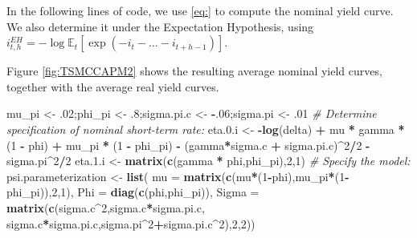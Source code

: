 \documentclass[
  12pt,
]{book}
\newenvironment{Shaded}{\begin{snugshade}}{\end{snugshade}}
\newcommand{\AttributeTok}[1]{\textcolor[rgb]{0.13,0.29,0.53}{#1}}
\newcommand{\CommentTok}[1]{\textcolor[rgb]{0.56,0.35,0.01}{\textit{#1}}}
\newcommand{\DecValTok}[1]{\textcolor[rgb]{0.00,0.00,0.81}{#1}}
\newcommand{\FloatTok}[1]{\textcolor[rgb]{0.00,0.00,0.81}{#1}}
\newcommand{\FunctionTok}[1]{\textcolor[rgb]{0.13,0.29,0.53}{\textbf{#1}}}
\newcommand{\NormalTok}[1]{#1}
\newcommand{\OtherTok}[1]{\textcolor[rgb]{0.56,0.35,0.01}{#1}}
\newcommand{\SpecialCharTok}[1]{\textcolor[rgb]{0.81,0.36,0.00}{\textbf{#1}}}
\theoremstyle{definition}
\theoremstyle{definition}
\theoremstyle{definition}
\theoremstyle{definition}
\theoremstyle{remark}
\begin{document}
In the following lines of code, we use \ref{eq:} to compute the nominal yield curve. We also determine it under the Expectation Hypothesis, using \(i^{EH}_{t,h} = - \log \mathbb{E}_t [\exp(-i_t - \dots - i_{t+h-1})]\).

Figure \ref{fig:TSMCCAPM2} shows the resulting average nominal yield curves, together with the average real yield curves.

\begin{Shaded}
\begin{Highlighting}[]
\NormalTok{mu\_pi }\OtherTok{\textless{}{-}}\NormalTok{ .}\DecValTok{02}\NormalTok{;phi\_pi }\OtherTok{\textless{}{-}}\NormalTok{ .}\DecValTok{8}\NormalTok{;sigma.pi.c }\OtherTok{\textless{}{-}} \SpecialCharTok{{-}}\NormalTok{.}\DecValTok{06}\NormalTok{;sigma.pi   }\OtherTok{\textless{}{-}}\NormalTok{ .}\DecValTok{01}
\CommentTok{\# Determine specification of nominal short{-}term rate:}
\NormalTok{eta.}\FloatTok{0.}\NormalTok{i }\OtherTok{\textless{}{-}} \SpecialCharTok{{-}}\FunctionTok{log}\NormalTok{(delta) }\SpecialCharTok{+}\NormalTok{ mu }\SpecialCharTok{*}\NormalTok{ gamma }\SpecialCharTok{*}\NormalTok{ (}\DecValTok{1} \SpecialCharTok{{-}}\NormalTok{ phi) }\SpecialCharTok{+}\NormalTok{ mu\_pi }\SpecialCharTok{*}\NormalTok{ (}\DecValTok{1} \SpecialCharTok{{-}}\NormalTok{ phi\_pi) }\SpecialCharTok{{-}}
\NormalTok{  (gamma}\SpecialCharTok{*}\NormalTok{sigma.c }\SpecialCharTok{+}\NormalTok{ sigma.pi.c)}\SpecialCharTok{\^{}}\DecValTok{2}\SpecialCharTok{/}\DecValTok{2} \SpecialCharTok{{-}}\NormalTok{ sigma.pi}\SpecialCharTok{\^{}}\DecValTok{2}\SpecialCharTok{/}\DecValTok{2}
\NormalTok{eta.}\FloatTok{1.}\NormalTok{i }\OtherTok{\textless{}{-}} \FunctionTok{matrix}\NormalTok{(}\FunctionTok{c}\NormalTok{(gamma }\SpecialCharTok{*}\NormalTok{ phi,phi\_pi),}\DecValTok{2}\NormalTok{,}\DecValTok{1}\NormalTok{)}
\CommentTok{\# Specify the model:}
\NormalTok{psi.parameterization }\OtherTok{\textless{}{-}} \FunctionTok{list}\NormalTok{(}
  \AttributeTok{mu =} \FunctionTok{matrix}\NormalTok{(}\FunctionTok{c}\NormalTok{(mu}\SpecialCharTok{*}\NormalTok{(}\DecValTok{1}\SpecialCharTok{{-}}\NormalTok{phi),mu\_pi}\SpecialCharTok{*}\NormalTok{(}\DecValTok{1}\SpecialCharTok{{-}}\NormalTok{phi\_pi)),}\DecValTok{2}\NormalTok{,}\DecValTok{1}\NormalTok{),}
  \AttributeTok{Phi =} \FunctionTok{diag}\NormalTok{(}\FunctionTok{c}\NormalTok{(phi,phi\_pi)),}
  \AttributeTok{Sigma =} \FunctionTok{matrix}\NormalTok{(}\FunctionTok{c}\NormalTok{(sigma.c}\SpecialCharTok{\^{}}\DecValTok{2}\NormalTok{,sigma.c}\SpecialCharTok{*}\NormalTok{sigma.pi.c,}
\NormalTok{                   sigma.c}\SpecialCharTok{*}\NormalTok{sigma.pi.c,sigma.pi}\SpecialCharTok{\^{}}\DecValTok{2}\SpecialCharTok{+}\NormalTok{sigma.pi.c}\SpecialCharTok{\^{}}\DecValTok{2}\NormalTok{),}\DecValTok{2}\NormalTok{,}\DecValTok{2}\NormalTok{))}

\end{Highlighting}
\end{Shaded}
\end{document}

